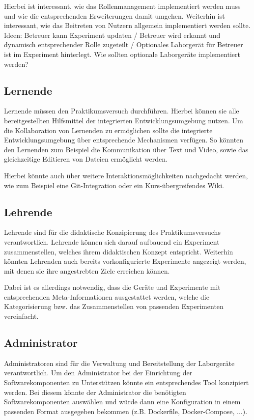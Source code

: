 \begin{note}
    Hierbei ist interessant, wie das Rollenmanagement implementiert werden muss und wie die entsprechenden Erweiterungen damit umgehen. Weiterhin ist interessant, wie das Beitreten von Nutzern allgemein implementiert werden sollte. Ideen: Betreuer kann Experiment updaten / Betreuer wird erkannt und dynamisch entsprechender Rolle zugeteilt / Optionales Laborgerät für Betreuer ist im Experiment hinterlegt. Wie sollten optionale Laborgeräte implementiert werden?
\end{note}

\subsection{Lernende}

Lernende müssen den Praktikumsversuch durchführen. Hierbei können sie alle bereitgestellten Hilfsmittel der integrierten Entwicklungsumgebung nutzen. Um die Kollaboration von Lernenden zu ermöglichen sollte die integrierte Entwicklungsumgebung über entsprechende Mechanismen verfügen. So könnten den Lernenden zum Beispiel die Kommunikation über Text und Video, sowie das gleichzeitige Editieren von Dateien ermöglicht werden.

\begin{note}
    Hierbei könnte auch über weitere Interaktionsmöglichkeiten nachgedacht werden, wie zum Beispiel eine Git-Integration oder ein Kurs-übergreifendes Wiki.
\end{note}

\subsection{Lehrende}

Lehrende sind für die didaktische Konzipierung des Praktikumsversuchs verantwortlich. Lehrende können sich darauf aufbauend ein Experiment zusammenstellen, welches ihrem didaktischen Konzept entspricht. Weiterhin könnten Lehrenden auch bereits vorkonfigurierte Experimente angezeigt werden, mit denen sie ihre angestrebten Ziele erreichen können.

\begin{note}
    Dabei ist es allerdings notwendig, dass die Geräte und Experimente mit entsprechenden Meta-Informationen ausgestattet werden, welche die Kategorisierung bzw. das Zusammenstellen von passenden Experimenten vereinfacht.
\end{note}

\subsection{Administrator}

Administratoren sind für die Verwaltung und Bereitstellung der Laborgeräte verantwortlich. Um den Administrator bei der Einrichtung der Softwarekomponenten zu Unterstützen könnte ein entsprechendes Tool konzipiert werden. Bei diesem könnte der Administrator die benötigten Softwarekomponenten auswählen und würde dann eine Konfiguration in einem passenden Format ausgegeben bekommen (z.B. Dockerfile, Docker-Compose, ...).